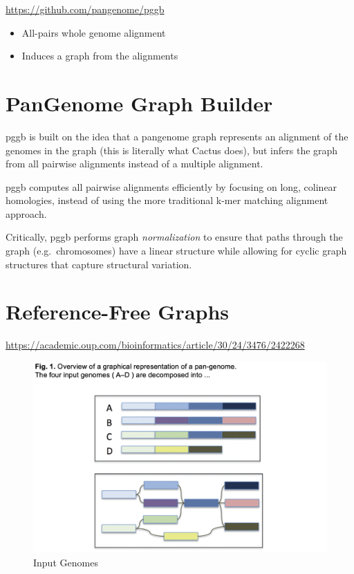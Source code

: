 \documentclass[
]{book}
\providecommand{\tightlist}{%
  \setlength{\itemsep}{0pt}\setlength{\parskip}{0pt}}
\begin{document}
\url{https://github.com/pangenome/pggb}

\begin{itemize}
\tightlist
\item
  All-pairs whole genome alignment
\item
  Induces a graph from the alignments
\end{itemize}

\hypertarget{pangenome-graph-builder}{%
\section{PanGenome Graph Builder}\label{pangenome-graph-builder}}

pggb is built on the idea that a pangenome graph represents an alignment of the genomes in the graph (this is literally what Cactus does), but infers the graph from all pairwise alignments instead of a multiple alignment.

pggb computes all pairwise alignments efficiently by focusing on long, colinear homologies, instead of using the more traditional k-mer matching alignment approach.

Critically, pggb performs graph \emph{normalization} to ensure that paths through the graph (e.g.~chromosomes) have a linear structure while allowing for cyclic graph structures that capture structural variation.

\hypertarget{reference-free-graphs-1}{%
\section{Reference-Free Graphs}\label{reference-free-graphs-1}}

\url{https://academic.oup.com/bioinformatics/article/30/24/3476/2422268}

\begin{figure}
\centering
\includegraphics[width=1\textwidth,height=\textheight]{./Figures/InputGenomes.png}
\caption{Input Genomes}
\end{figure}
\end{document}
